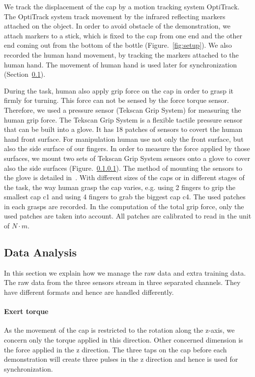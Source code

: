 We track the displacement of the cap by a motion tracking system OptiTrack. The OptiTrack system track movement by the infrared reflecting markers attached on the object. In order to avoid obstacle of the demonstration, we attach markers to a stick, which is fixed to the cap from one end and the other end coming out from the bottom of the bottle (Figure.~\ref{fig:setup}). We also recorded the human hand movement, by tracking the markers attached to the human hand. The movement of human hand is used later for synchronization (Section~\ref{dataanalysis}).

During the task, human also apply grip force on the cap in order to grasp it firmly for turning. This force can not be sensed by the force torque sensor. Therefore, we used a pressure sensor (Tekscan Grip System) for measuring the human grip force. The Tekscan Grip System is a flexible tactile pressure sensor that can be built into a glove. It has 18 patches of sensors to covert the human hand front surface. For manipulation human use not only the front surface, but also the side surface of our fingers. In order to measure the force applied by those surfaces, we mount two sets of Tekscan Grip System sensors onto a glove to cover also the side surfaces (Figure.~\ref{ftsensor}). The method of mounting the sensors to the glove is detailed in~\citep{deSouza2014}. With different sizes of the caps or in different stages of the task, the way human grasp the cap varies, e.g. using 2 fingers to grip the smallest cap c1 and using 4 fingers to grab the biggest cap c4. The used patches in each grasps are recorded. In the computation of the total grip force, only the used patches are taken into account. All patches are calibrated to read in the unit of $N{\cdot}m$.


\subsection{Data Analysis}
\label{dataanalysis}
In this section we explain how we manage the raw data and extra training data.
The raw data from the three sensors stream in three separated channels. They have different formats and hence are handled differently.

\paragraph{\textbf{Exert torque}}
\label{ftsensor}
As the movement of the cap is restricted to the rotation along the z-axis, we concern only the torque applied in this direction.  %
Other concerned dimension is the force applied in the z direction. The three taps on the cap before each demonstration will create three pulses in the z direction and hence is used for synchronization.


